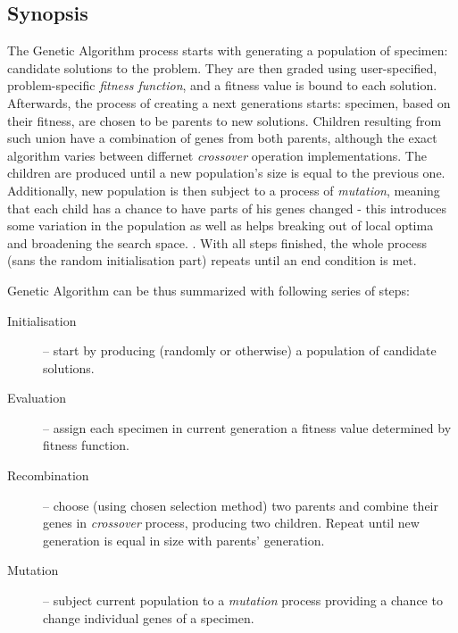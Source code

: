 \subsection{Synopsis}
The Genetic Algorithm process starts with generating a population of specimen: candidate solutions to the problem. They are then graded using user-specified, problem-specific \textit{fitness function}, and a fitness value is bound to each solution. Afterwards, the process of creating a next generations starts: specimen, based on their fitness, are chosen to be parents to new solutions. Children resulting from such union have a combination of genes from both parents, although the exact algorithm varies between differnet \textit{crossover} operation implementations. The children are produced until a new population's size is equal to the previous one. Additionally, new population is then subject to a process of \textit{mutation}, meaning that each child has a chance to have parts of his genes changed - this introduces some variation in the population as well as helps breaking out of local optima and broadening the search space. \cite{Luke2013Metaheuristics}. With all steps finished, the whole process (sans the random initialisation part) repeats until an end condition is met.

Genetic Algorithm can be thus summarized with following series of steps:
\begin{description}
    \item[Initialisation] -- start by producing (randomly or otherwise) a population of candidate solutions.
    \item[Evaluation] -- assign each specimen in current generation a fitness value determined by fitness function.
    \item[Recombination] -- choose (using chosen selection method) two parents and combine their genes in \textit{crossover} process, producing two children. Repeat until new generation is equal in size with parents' generation.  %
    \item[Mutation] -- subject current population to a \textit{mutation} process providing a chance to change individual genes of a specimen.
\end{description}

